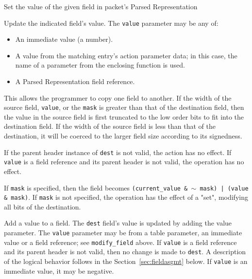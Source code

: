 \documentclass[12pt]{article}
\begin{document}
{ %
Set the value of the given field in packet's Parsed Representation
}
{ %
}
{ %
Update the indicated field's value. The \texttt{value} parameter may be any of:

\begin{itemize}
\item
An immediate value (a number).
\item
A value from the matching entry's action parameter data; in this case, the 
name of a parameter from the enclosing function is used.
\item
A Parsed Representation field reference.
\end{itemize}


This allows the programmer to copy one field to another. If the width of 
the source field, \texttt{value}, or the \texttt{mask} is greater than that of the destination 
field, then the value in the source field is first truncated to the low order 
bits to fit into the destination field. If the width of the source field 
is less than that of the destination, it will be coerced to the larger field 
size according to its signedness.

If the parent header instance of \texttt{dest} is not valid, the action has no effect. 
If \texttt{value} is a field reference and its parent header is not valid, the operation 
has no effect.

If \texttt{mask} is specified, then the field becomes \texttt{(current_value \& $\sim$ mask) | 
(value \& mask)}.  If \texttt{mask} is not specified, the operation has the effect 
of a "set", modifying all bits of the destination. 

}


{ %
Add a value to a field.
}
{ %
}
{ %
The \texttt{dest} field's value is updated by adding the value parameter. The \texttt{value} parameter 
may be from a table parameter, an immediate value or a field reference; see \texttt{modify_field} above.  If \texttt{value} is a field reference 
and its parent header is not valid, then no change is made to \texttt{dest}. A description 
of the logical behavior follows in the Section~\ref{sec:fieldasgmt} below.
If \texttt{value} is an immediate value, it may 
be negative.
}
\end{document}
